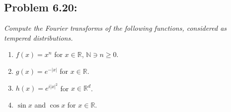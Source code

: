 \documentclass[letterpaper,twoside,11pt]{article}
\theoremstyle{mystyle}
\newcommand{\R}{{\mathbb R}}
\newcommand{\N}{{\mathbb N}}
\begin{document}
\newpage 
\subsection*{Problem 6.20:}
\textit{Compute the Fourier transforms of the following functions, considered as tempered distributions. }
\begin{enumerate}
  \item $f(x) = x^n$ for $x \in \R$, $\N \ni n \geq 0$. 
  \item $g(x) = e^{-|x|}$ for $x\in \R$. 
  \item $h(x) = e^{i|x|^2}$ for $x\in \R^d$. 
  \item $\sin x$ and $\cos x$ for $x\in \R$. 
\end{enumerate}
\end{document}
